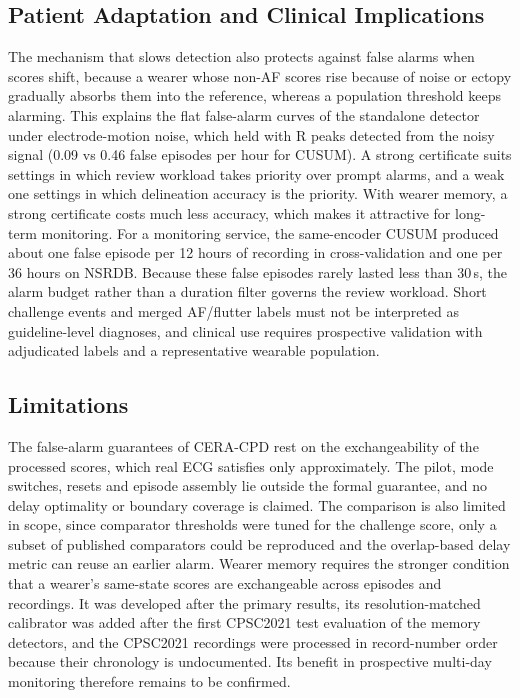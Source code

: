 \documentclass[preprint,12pt]{elsarticle}
\newcommand{\method}{CERA-CPD}
\newcommand{\1}{\mathbf{1}}
\begin{document}
\subsection{Patient Adaptation and Clinical Implications}
The mechanism that slows detection also protects against false alarms when scores shift, because a wearer whose non-AF scores rise because of noise or ectopy gradually absorbs them into the reference, whereas a population threshold keeps alarming. This explains the flat false-alarm curves of the standalone detector under electrode-motion noise, which held with R peaks detected from the noisy signal (0.09 vs 0.46 false episodes per hour for CUSUM). A strong certificate suits settings in which review workload takes priority over prompt alarms, and a weak one settings in which delineation accuracy is the priority. With wearer memory, a strong certificate costs much less accuracy, which makes it attractive for long-term monitoring. For a monitoring service, the same-encoder CUSUM produced about one false episode per 12 hours of recording in cross-validation and one per 36 hours on NSRDB. Because these false episodes rarely lasted less than 30\,s, the alarm budget rather than a duration filter governs the review workload. Short challenge events and merged AF/flutter labels must not be interpreted as guideline-level diagnoses, and clinical use requires prospective validation with adjudicated labels and a representative wearable population.

\subsection{Limitations}
\label{sec:limitations}
The false-alarm guarantees of \method{} rest on the exchangeability of the processed scores, which real ECG satisfies only approximately. The pilot, mode switches, resets and episode assembly lie outside the formal guarantee, and no delay optimality or boundary coverage is claimed. The comparison is also limited in scope, since comparator thresholds were tuned for the challenge score, only a subset of published comparators could be reproduced and the overlap-based delay metric can reuse an earlier alarm. Wearer memory requires the stronger condition that a wearer's same-state scores are exchangeable across episodes and recordings. It was developed after the primary results, its resolution-matched calibrator was added after the first CPSC2021 test evaluation of the memory detectors, and the CPSC2021 recordings were processed in record-number order because their chronology is undocumented. Its benefit in prospective multi-day monitoring therefore remains to be confirmed.
\end{document}
